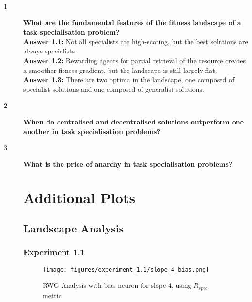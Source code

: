 \documentclass[12pt]{article}
\begin{document}
\begin{description}
\item[1] \textbf{What are the fundamental features of the fitness landscape of a task specialisation problem?}\\

\textbf{Answer 1.1:} Not all specialists are high-scoring, but the best solutions are always specialists.\\

\textbf{Answer 1.2:} Rewarding agents for partial retrieval of the resource creates a smoother fitness gradient, but the landscape is still largely flat.\\

\textbf{Answer 1.3:} There are two optima in the landscape, one composed of specialist solutions and one composed of generalist solutions.\\

\item[2] \textbf{When do centralised and decentralised solutions outperform one another in task specialisation problems?}\\



\item[3] \textbf{What is the price of anarchy in task specialisation problems?}\\

\section{Additional Plots}

\subsection{Landscape Analysis}

\subsubsection{Experiment 1.1}
\begin{figure}[h]
\centering
\texttt{[image: figures/experiment\_1.1/slope\_4\_bias.png]}
\caption{RWG Analysis with bias neuron for slope 4, using $R_{spec}$ metric}
\label{fig:slope_4_bias}
\end{figure}

\end{description}
\end{document}
